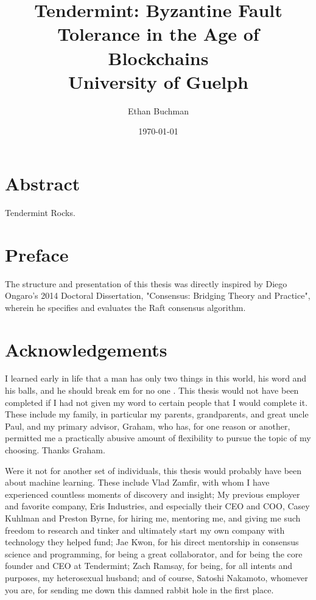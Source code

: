 \documentclass[12pt]{report}
\begin{document}
\title{
	{Tendermint: Byzantine Fault Tolerance in the Age of Blockchains}\\
	{\large University of Guelph}\\
}

\author{Ethan Buchman}
\date{\today}

\maketitle

\clearpage
\thispagestyle{plain}
\par\vspace*{.35\textheight}{\centering Dedicated to Theda. \par}

\chapter*{Abstract}
Tendermint Rocks.

\chapter*{Preface}
The structure and presentation of this thesis was directly inspired by Diego Ongaro's 2014 Doctoral Dissertation, 
"Consensus: Bridging Theory and Practice", wherein he specifies and evaluates the Raft consensus algorithm.

\chapter*{Acknowledgements}
I learned early in life that a man has only two things in this world, his word and his balls, and he should break em for no one \cite{scarface}. 
This thesis would not have been completed if I had not given my word to certain people that I would complete it.
These include my family, in particular my parents, grandparents, and great uncle Paul, and my primary advisor, Graham,
who has, for one reason or another, permitted me a practically abusive amount of flexibility to pursue the topic of my choosing.
Thanks Graham.

Were it not for another set of individuals, this thesis would probably have been about machine learning.
These include Vlad Zamfir, with whom I have experienced countless moments of discovery and insight;
My previous employer and favorite company, Eris Industries, and especially their CEO and COO, Casey Kuhlman and Preston Byrne,
for hiring me, mentoring me, and giving me such freedom to research and tinker and ultimately start my own company with technology they helped fund;
Jae Kwon, for his direct mentorship in consensus science and programming, for being a great collaborator, and for being the core founder and CEO at Tendermint;
Zach Ramsay, for being, for all intents and purposes, my heterosexual husband;
and of course, Satoshi Nakamoto, whomever you are, for sending me down this damned rabbit hole in the first place.
\end{document}
